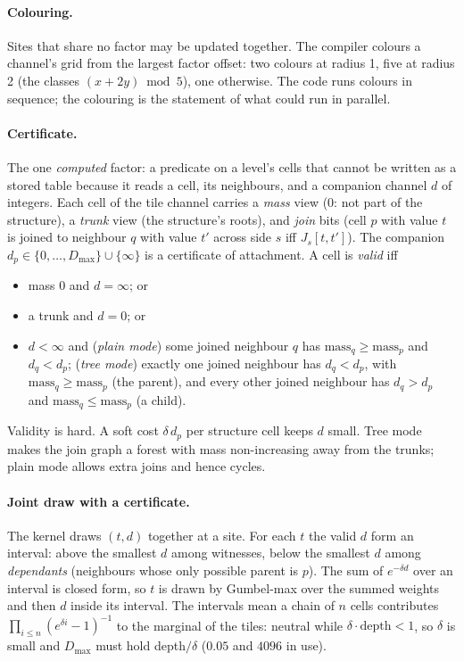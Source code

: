 \documentclass[11pt]{article}
\newcommand{\1}{\mathds{1}}
\begin{document}
\paragraph{Colouring.} Sites that share no factor may be updated together.
The compiler colours a channel's grid from the largest factor offset:
two colours at radius 1, five at radius 2 (the classes $(x + 2y) \bmod 5$),
one otherwise. The code runs colours in sequence; the colouring is the
statement of what could run in parallel.

\paragraph{Certificate.} The one \emph{computed} factor: a predicate on a
level's cells that cannot be written as a stored table because it reads a
cell, its neighbours, and a companion channel $d$ of integers. Each cell of
the tile channel carries a \emph{mass} view ($0$: not part of the
structure), a \emph{trunk} view (the structure's roots), and \emph{join}
bits (cell $p$ with value $t$ is joined to neighbour $q$ with value $t'$
across side $s$ iff $J_s[t, t']$). The companion $d_p \in \{0, \dots,
D_{\max}\} \cup \{\infty\}$ is a certificate of attachment. A cell is
\emph{valid} iff
\begin{itemize}
\item mass $0$ and $d = \infty$; or
\item a trunk and $d = 0$; or
\item $d < \infty$ and (\emph{plain mode}) some joined neighbour $q$ has
  $\text{mass}_q \ge \text{mass}_p$ and $d_q < d_p$; (\emph{tree mode})
  exactly one joined neighbour has $d_q < d_p$, with $\text{mass}_q \ge
  \text{mass}_p$ (the parent), and every other joined neighbour has
  $d_q > d_p$ and $\text{mass}_q \le \text{mass}_p$ (a child).
\end{itemize}
Validity is hard. A soft cost $\delta\, d_p$ per structure cell keeps $d$
small. Tree mode makes the join graph a forest with mass non-increasing
away from the trunks; plain mode allows extra joins and hence cycles.

\paragraph{Joint draw with a certificate.} The kernel draws $(t, d)$
together at a site. For each $t$ the valid $d$ form an interval:
above the smallest $d$ among witnesses, below the smallest $d$ among
\emph{dependants} (neighbours whose only possible parent is $p$). The sum
of $e^{-\delta d}$ over an interval is closed form, so $t$ is drawn by
Gumbel-max over the summed weights and then $d$ inside its interval. The
intervals mean a chain of $n$ cells contributes
$\prod_{i \le n} (e^{\delta i} - 1)^{-1}$ to the marginal of the tiles:
neutral while $\delta \cdot \text{depth} < 1$, so $\delta$ is small and
$D_{\max}$ must hold depth$/\delta$ ($0.05$ and $4096$ in use).
\end{document}
